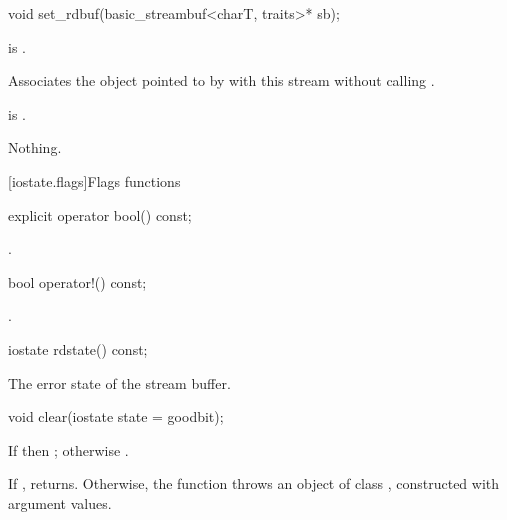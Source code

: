%
\begin{itemdecl}
void set_rdbuf(basic_streambuf<charT, traits>* sb);
\end{itemdecl}

\begin{itemdescr}
\pnum
\expects
{} is .

\pnum
\effects
Associates the  object
pointed to by  with this stream without calling
.

\pnum
\ensures
{} is .

\pnum
\throws
Nothing.
\end{itemdescr}

[iostate.flags]{Flags functions}

%
\begin{itemdecl}
explicit operator bool() const;
\end{itemdecl}

\begin{itemdescr}
\pnum
\returns
{}.
\end{itemdescr}

%
\begin{itemdecl}
bool operator!() const;
\end{itemdecl}

\begin{itemdescr}
\pnum
\returns
{}.
\end{itemdescr}

%
\begin{itemdecl}
iostate rdstate() const;
\end{itemdecl}

\begin{itemdescr}
\pnum
\returns
The error state of the stream buffer.
\end{itemdescr}

%
\begin{itemdecl}
void clear(iostate state = goodbit);
\end{itemdecl}

\begin{itemdescr}
\pnum
\ensures
If
then
;
otherwise
.

\pnum
\effects
If ,
returns.
Otherwise, the function throws an object of class
,
constructed with
argument values.%
\end{itemdescr}

